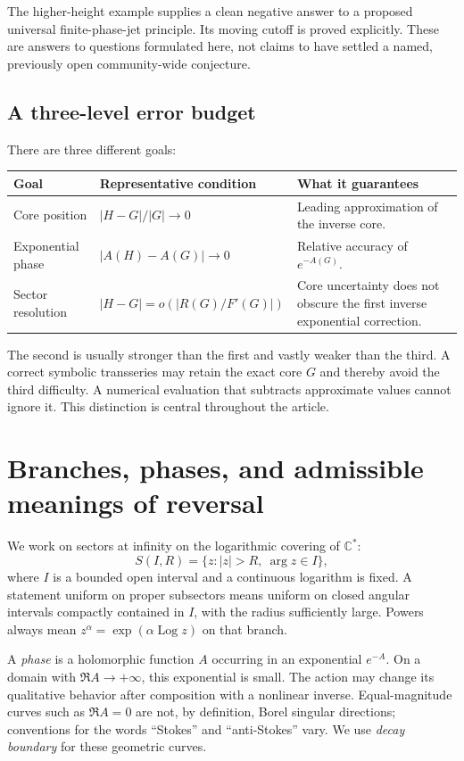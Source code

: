 \documentclass[11pt,a4paper]{article}
\theoremstyle{definition}
\theoremstyle{remark}
\newcommand{\C}{\mathbb C}
\newcommand{\Log}{\operatorname{Log}}
\numberwithin{equation}{section}
\begin{document}
The higher-height example supplies a clean negative answer to a proposed universal finite-phase-jet principle. Its moving cutoff is proved explicitly. These are answers to questions formulated here, not claims to have settled a named, previously open community-wide conjecture.

\subsection{A three-level error budget}

There are three different goals:
\begin{center}
\begin{tabular}{@{}p{}p{}p{}@{}}
\toprule
Goal & Representative condition & What it guarantees \\
\midrule
Core position & $|H-G|/|G|\to0$ & Leading approximation of the inverse core. \\
Exponential phase & $|A(H)-A(G)|\to0$ & Relative accuracy of $e^{-A(G)}$. \\
Sector resolution & $|H-G|=o(|R(G)/F'(G)|)$ & Core uncertainty does not obscure the first inverse exponential correction. \\
\bottomrule
\end{tabular}
\end{center}
The second is usually stronger than the first and vastly weaker than the third. A correct symbolic transseries may retain the exact core $G$ and thereby avoid the third difficulty. A numerical evaluation that subtracts approximate values cannot ignore it. This distinction is central throughout the article.

\section{Branches, phases, and admissible meanings of reversal}\label{sec:framework}

We work on sectors at infinity on the logarithmic covering of $\C^*$:
\[
 S(I,R)=\{z:|z|>R,\ \arg z\in I\},
\]
where $I$ is a bounded open interval and a continuous logarithm is fixed. A statement uniform on proper subsectors means uniform on closed angular intervals compactly contained in $I$, with the radius sufficiently large. Powers always mean $z^\alpha=\exp(\alpha\Log z)$ on that branch.

A \emph{phase} is a holomorphic function $A$ occurring in an exponential $e^{-A}$. On a domain with $\Re A\to+\infty$, this exponential is small. The action may change its qualitative behavior after composition with a nonlinear inverse. Equal-magnitude curves such as $\Re A=0$ are not, by definition, Borel singular directions; conventions for the words ``Stokes'' and ``anti-Stokes'' vary. We use \emph{decay boundary} for these geometric curves.
\end{document}
